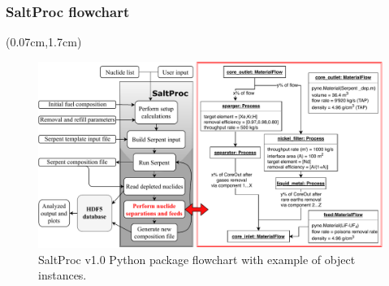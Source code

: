 \begin{frame}
\frametitle{SaltProc flowchart}
\begin{textblock*}{12.4cm}(0.07cm,1.7cm) %
\begin{figure}[ht!] %
	\centering
	\includegraphics[width=\textwidth]{../dissertation/figures/ch2/saltproc_flowchart.pdf}
		\vspace{-4mm}
	\caption{SaltProc v1.0 Python package flowchart with example of object 
	instances.}
\end{figure}
\end{textblock*}

\end{frame}


